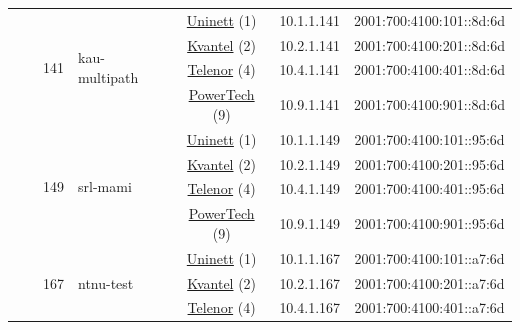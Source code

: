 \begin{small}
\begin{center}
\begin{longtable}{|c|c|c|c|c|c|c|c|}
  &  & \multirow{4}{*}{\tiny{141}} & \multicolumn{1}{|l|}{\multirow{4}{*}{\tiny{kau-multipath}}} & \multicolumn{2}{|c|}{\tiny{\href{https://www.uninett.no}{Uninett} (1)}} & \tiny{10.1.1.141} & \tiny{2001:700:4100:101::8d:6d} \\* \cline{5-5}\cline{6-6}\cline{7-7}\cline{8-8}
  &  &  &  & \multicolumn{2}{|c|}{\tiny{\href{http://kvantel.no}{Kvantel} (2)}} & \tiny{10.2.1.141} & \tiny{2001:700:4100:201::8d:6d} \\* \cline{5-5}\cline{6-6}\cline{7-7}\cline{8-8}
  &  &  &  & \multicolumn{2}{|c|}{\tiny{\href{https://www.telenor.no}{Telenor} (4)}} & \tiny{10.4.1.141} & \tiny{2001:700:4100:401::8d:6d} \\* \cline{5-5}\cline{6-6}\cline{7-7}\cline{8-8}
  &  &  &  & \multicolumn{2}{|c|}{\tiny{\href{http://www.powertech.no}{PowerTech} (9)}} & \tiny{10.9.1.141} & \tiny{2001:700:4100:901::8d:6d} \\* \cline{3-3}\cline{4-4}\cline{5-5}\cline{6-6}\cline{7-7}\cline{8-8}
  &  & \multirow{4}{*}{\tiny{149}} & \multicolumn{1}{|l|}{\multirow{4}{*}{\tiny{srl-mami}}} & \multicolumn{2}{|c|}{\tiny{\href{https://www.uninett.no}{Uninett} (1)}} & \tiny{10.1.1.149} & \tiny{2001:700:4100:101::95:6d} \\* \cline{5-5}\cline{6-6}\cline{7-7}\cline{8-8}
  &  &  &  & \multicolumn{2}{|c|}{\tiny{\href{http://kvantel.no}{Kvantel} (2)}} & \tiny{10.2.1.149} & \tiny{2001:700:4100:201::95:6d} \\* \cline{5-5}\cline{6-6}\cline{7-7}\cline{8-8}
  &  &  &  & \multicolumn{2}{|c|}{\tiny{\href{https://www.telenor.no}{Telenor} (4)}} & \tiny{10.4.1.149} & \tiny{2001:700:4100:401::95:6d} \\* \cline{5-5}\cline{6-6}\cline{7-7}\cline{8-8}
  &  &  &  & \multicolumn{2}{|c|}{\tiny{\href{http://www.powertech.no}{PowerTech} (9)}} & \tiny{10.9.1.149} & \tiny{2001:700:4100:901::95:6d} \\* \cline{3-3}\cline{4-4}\cline{5-5}\cline{6-6}\cline{7-7}\cline{8-8}
  &  & \multirow{4}{*}{\tiny{167}} & \multicolumn{1}{|l|}{\multirow{4}{*}{\tiny{ntnu-test}}} & \multicolumn{2}{|c|}{\tiny{\href{https://www.uninett.no}{Uninett} (1)}} & \tiny{10.1.1.167} & \tiny{2001:700:4100:101::a7:6d} \\* \cline{5-5}\cline{6-6}\cline{7-7}\cline{8-8}
  &  &  &  & \multicolumn{2}{|c|}{\tiny{\href{http://kvantel.no}{Kvantel} (2)}} & \tiny{10.2.1.167} & \tiny{2001:700:4100:201::a7:6d} \\* \cline{5-5}\cline{6-6}\cline{7-7}\cline{8-8}
  &  &  &  & \multicolumn{2}{|c|}{\tiny{\href{https://www.telenor.no}{Telenor} (4)}} & \tiny{10.4.1.167} & \tiny{2001:700:4100:401::a7:6d} \\* \cline{5-5}\cline{6-6}\cline{7-7}\cline{8-8}

\end{longtable}
\end{center}
\end{small}
